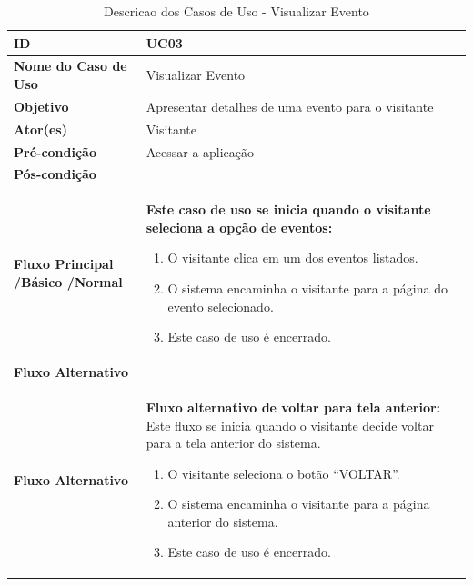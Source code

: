 \begin{table}[t]
\begin{tabular}{| p{6cm} | p{10cm} |}
	\hline
	\textbf{ID} & UC03\tabularnewline
	\hline
	\hline
	\textbf{Nome do Caso de Uso} & Visualizar Evento\tabularnewline
	\hline
	\textbf{Objetivo} & Apresentar detalhes de uma evento para o visitante\tabularnewline
	\hline
	\textbf{Ator(es)} & Visitante\tabularnewline
	\hline
	\textbf{Pré-condição} & Acessar a aplicação\tabularnewline
	\hline
	\textbf{Pós-condição} & \tabularnewline
	\hline
	\textbf{Fluxo Principal /Básico /Normal} & \textbf{Este caso de uso se inicia quando o visitante seleciona a opção de eventos:}
	\vspace{0.2cm}
	\begin{enumerate}
		\item O visitante clica em um dos eventos listados.
		\item O sistema encaminha o visitante para a página do evento selecionado.
		\item Este caso de uso é encerrado.
	\end{enumerate} \tabularnewline
	\hline
	\textbf{Fluxo Alternativo} & \tabularnewline
	\hline
	\textbf{Fluxo Alternativo} & \textbf{Fluxo alternativo de voltar para tela anterior:}
	\vspace{0.2cm}
	Este fluxo se inicia quando o visitante decide voltar para a tela anterior do sistema.
	\begin{enumerate}
		\item O visitante seleciona o botão “VOLTAR”.
		\item O sistema encaminha o visitante para a página anterior do sistema.
		\item Este caso de uso é encerrado.
	\end{enumerate} \tabularnewline
	\hline
\end{tabular}
\caption{Descricao dos Casos de Uso - Visualizar Evento}
\label{DCU_Visualizar_Evento}
\end{table}

